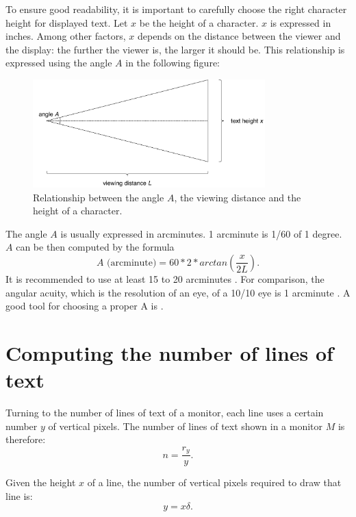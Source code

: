 \documentclass{article}
\begin{document}
To ensure good readability, it is important to carefully choose the right character height for displayed text. Let $x$ be the height of a character. $x$ is expressed in inches. Among other factors, $x$ depends on the distance between the viewer and the display: the further the viewer is, the larger it should be. This relationship is expressed using the angle $A$ in the following figure:

\begin{figure}[!h]
   \centering
   \includegraphics[page=1,width=0.8\textwidth]{angle.pdf}
 \caption{Relationship between the angle $A$, the viewing distance and the height of a character.}
 \label{fig:arch}
\end{figure}

The angle $A$ is usually expressed in arcminutes. 1 arcminute is 1/60 of 1 degree. $A$ can be then computed by the formula
\begin{equation}
A \text{ (arcminute)} = 60 * 2 * arctan \left( \frac{x}{2L} \right).
\end{equation}
It is recommended to use at least 15 to 20 arcminutes \cite{extron}. For comparison, the angular acuity, which is the resolution of an eye, of a 10/10 eye is 1 arcminute \cite{wiki-va}. A good tool for choosing a proper A is \cite{leserlich}.

\section{Computing the number of lines of text}
Turning to the number of lines of text of a monitor, each line uses a certain number $y$ of vertical pixels. The number of lines of text shown in a monitor $M$ is therefore:
\begin{equation} \label{n}
n = \frac{r_y}{y}.
\end{equation}

Given the height $x$ of a line, the number of vertical pixels required to draw that line is:
\begin{equation} \label{y}
y = x \delta.
\end{equation}
\end{document}

